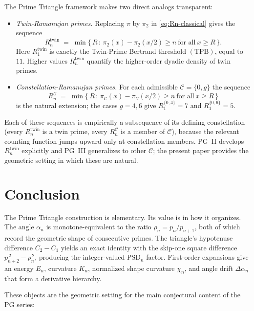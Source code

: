 \documentclass[11pt]{article}
\begin{document}
The Prime Triangle framework makes two direct analogs transparent:
\begin{itemize}
\item \emph{Twin-Ramanujan primes.} Replacing $\pi$ by $\pi_2$ in
\eqref{eq:Rn-classical} gives the sequence
\[
R^{\mathrm{twin}}_n \;=\; \min\Big\{\,R\,:\,\pi_2(x) - \pi_2(x/2) \ge n\ \text{for all}\ x \ge R\,\Big\}.
\]
Here $R^{\mathrm{twin}}_1$ is exactly the Twin-Prime Bertrand
threshold $(\mathrm{TPB})$, equal to $11$. Higher values
$R^{\mathrm{twin}}_n$ quantify the higher-order dyadic density of
twin primes.
\item \emph{Constellation-Ramanujan primes.} For each admissible
$\mathcal{C} = \{0, g\}$ the sequence
\[
R^{\mathcal{C}}_n \;=\; \min\Big\{\,R\,:\,\pi_{\mathcal{C}}(x) - \pi_{\mathcal{C}}(x/2) \ge n\ \text{for all}\ x \ge R\,\Big\}
\]
is the natural extension; the cases $g = 4, 6$ give
$R^{\{0,4\}}_1 = 7$ and $R^{\{0,6\}}_1 = 5$.
\end{itemize}

Each of these sequences is empirically a subsequence of its
defining constellation (every $R^{\mathrm{twin}}_n$ is a twin prime,
every $R^{\mathcal{C}}_n$ is a member of $\mathcal{C}$), because the
relevant counting function jumps upward only at constellation
members. PG~II develops $R^{\mathrm{twin}}_n$ explicitly and PG~III
generalizes to other $\mathcal{C}$; the present paper provides the
geometric setting in which these are natural.

\section{Conclusion}

The Prime Triangle construction is elementary. Its value is in how
it organizes. The angle $\alpha_n$ is monotone-equivalent to the
ratio $\rho_n = p_n / p_{n+1}$, both of which record the geometric
shape of consecutive primes. The triangle's hypotenuse difference
$C_2 - C_1$ yields an exact identity with the skip-one square
difference $p_{n+2}^{\,2} - p_n^{\,2}$, producing the integer-valued
$\mathrm{PSD}_n$ factor. First-order expansions give an energy
$E_n$, curvature $K_n$, normalized shape curvature $\chi_n$, and
angle drift $\Delta\alpha_n$ that form a derivative hierarchy.

These objects are the geometric setting for the main conjectural
content of the PG series:
\end{document}
